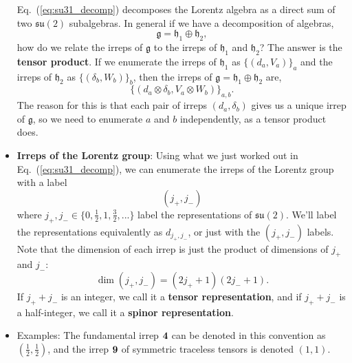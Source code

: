 \documentclass[12pt, oneside]{article}   	%
\theoremstyle{definition}
\begin{document}
\begin{itemize}
\begin{answerbox}
	\raggedright
	Eq.~(\ref{eq:su31_decomp}) decomposes the Lorentz algebra as a direct sum of two $\mathfrak{su}(2)$ subalgebras. In general if we have a decomposition of algebras,
	\begin{equation}
		\mathfrak{g} = \mathfrak{h}_1\oplus\mathfrak{h}_2,
	\end{equation}
	how do we relate the irreps of $\mathfrak{g}$ to the irreps of $\mathfrak{h}_1$ and $\mathfrak{h}_2$? The answer is the \textbf{tensor product}. If we enumerate the irreps of $\mathfrak{h}_1$ as $\{(d_a, V_a)\}_a$ and the irreps of $\mathfrak{h}_2$ as $\{(\delta_b, W_b)\}_b$, then the irreps of $\mathfrak g = \mathfrak{h}_1\oplus \mathfrak{h}_2$ are,
	\begin{equation}
		\{(d_a\otimes \delta_b, V_a\otimes W_b)\}_{a, b}.
	\end{equation}
	The reason for this is that each pair of irreps $(d_a, \delta_b)$ gives us a unique irrep of $\mathfrak g$, so we need to enumerate $a$ and $b$ independently, as a tensor product does. 
\end{answerbox}

	\item \textbf{Irreps of the Lorentz group}: Using what we just worked out in Eq.~(\ref{eq:su31_decomp}), we can enumerate the irreps of the Lorentz group with a label 
	\begin{equation}
		(j_+, j_-)
	\end{equation}
	where $j_+, j_-\in \{0, \frac{1}{2}, 1, \frac{3}{2}, ...\}$ label the representations of $\mathfrak{su}(2)$. We'll label the representations equivalently as $d_{j_+, j_-}$, or just with the $(j_+, j_-)$ labels. Note that the dimension of each irrep is just the product of dimensions of $j_+$ and $j_-$:
	\begin{equation}
		\dim(j_+, j_-) = (2j_+ + 1)(2 j_- + 1).
	\end{equation}
	If $j_+ + j_-$ is an integer, we call it a \textbf{tensor representation}, and if $j_+ + j_-$ is a half-integer, we call it a \textbf{spinor representation}. 
	
	\item Examples: The fundamental irrep $\bf 4$ can be denoted in this convention as $(\frac{1}{2}, \frac{1}{2})$, and the irrep 
$\bf 9$ of symmetric traceless tensors is denoted $(1, 1)$. 


\end{itemize}
\end{document}
